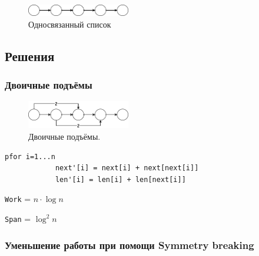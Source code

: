 \documentclass[11pt]{article}
\begin{document}
    \begin{figure}[h!]
        \centering
        \includegraphics[width=0.4\textwidth]{Pictures/List Ranking/List Ranking}
        \caption{Односвязанный список}
        \label{fig:list_ranking}
    \end{figure}
    
    \subsection*{Решения}
    
    \subsubsection*{Двоичные подъёмы}

    \begin{figure}[h!]
        \centering
        \includegraphics[width=0.4\textwidth]{Pictures/List Ranking/Binary lifts}
        \caption{Двоичные подъёмы.}
        \label{fig:binary_lifts}
    \end{figure}
    
    \begin{lstlisting}[label={lst:binary_lifts}]
        pfor i=1...n
            next'[i] = next[i] + next[next[i]]
            len'[i] = len[i] + len[next[i]]
    \end{lstlisting}

    \texttt{Work} = $n \cdot \log{n}$

    \texttt{Span} = $\log^2{n}$

    \subsubsection*{Уменьшение работы при помощи Symmetry breaking}
\end{document}
